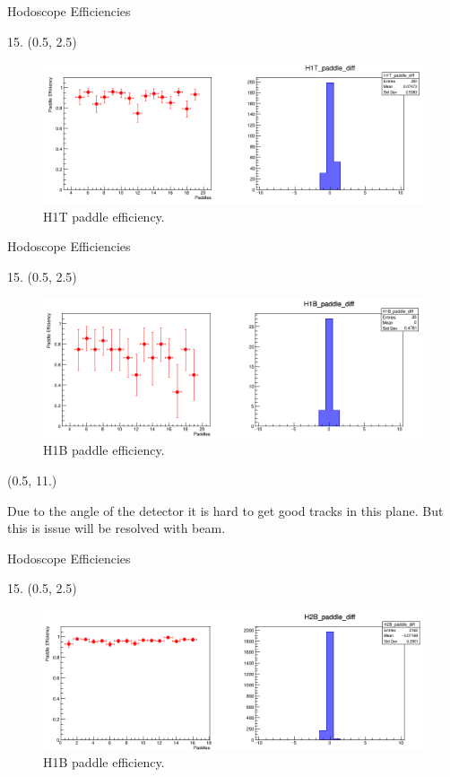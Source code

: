 \documentclass[12pt, xcolor={dvipsnames}, aspectratio = 169, sans,mathserif]{beamer}
\newenvironment{List}[2]
{
\begin{textblock}{#1}#2
\begin{itemize}
}
{
\end{itemize}
\end{textblock}
}
\newenvironment{Pic}[2]
{
\begin{textblock}{#1} #2
\begin{figure}
}
{
\end{figure}
\end{textblock}
}
\begin{document}
\begin{frame}{Hodoscope Efficiencies}
\begin{Pic}{15.}{(0.5, 2.5)}
  \includegraphics[width=15.0cm]{imgs/H1T_paddle_diff.png}
  \caption{H1T paddle efficiency.}
\end{Pic}
\end{frame}

\begin{frame}{Hodoscope Efficiencies}
\begin{Pic}{15.}{(0.5, 2.5)}
  \includegraphics[width=15.0cm]{imgs/H1B_paddle_diff.png}
  \caption{H1B paddle efficiency.}
\end{Pic}

\begin{List}{15.0}{(0.5, 11.)}
  \item Due to the angle of the detector it is hard to get good tracks in this plane. But this is issue will be resolved with beam.
\end{List}
\end{frame}

\begin{frame}{Hodoscope Efficiencies}
\begin{Pic}{15.}{(0.5, 2.5)}
  \includegraphics[width=15.0cm]{imgs/H2B_paddle_diff.png}
  \caption{H1B paddle efficiency.}
\end{Pic}
\end{frame}
\end{document}
